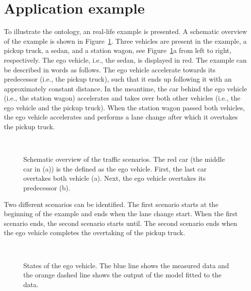 \section{Application example}
\label{sec:example}

To illustrate the ontology, an real-life example is presented. A schematic overview of the example is shown in Figure~\ref{fig:example schematic}. Three vehicles are present in the example, a pickup truck, a sedan, and a station wagon, see Figure~\ref{fig:example schematic}a from left to right, respectively. The ego vehicle, i.e., the sedan, is displayed in red. The example can be described in words as follows. The ego vehicle accelerate towards its predecessor (i.e., the pickup truck), such that it ends up following it with an approximately constant distance. In the meantime, the car behind the ego vehicle (i.e., the station wagon) accelerates and takes over both other vehicles (i.e., the ego vehicle and the pickup truck). When the station wagon passed both vehicles, the ego vehicle accelerates and performs a lane change after which it overtakes the pickup truck.

\begin{figure}
	\centering
	\setlength\figureheight{100pt}
	\setlength\figurewidth{260pt}
	\\
	\caption{Schematic overview of the traffic scenarios. The red car (the middle car in (a)) is the defined as the ego vehicle. First, the last car overtakes both vehicle (a). Next, the ego vehicle overtakes its predecessor (b).}
	\label{fig:example schematic}
\end{figure}

Two different scenarios can be identified. The first scenario starts at the beginning of the example and ends when the lane change start. When the first scenario ends, the second scenario starts until. The second scenario ends when the ego vehicle completes the overtaking of the pickup truck.

\begin{figure}
	\centering
	\setlength\figureheight{150pt}
	\setlength\figurewidth{248pt}
	\\
	\caption{States of the ego vehicle. The blue line shows the measured data and the orange dashed line shows the output of the model fitted to the data.}
\end{figure}

\color{black}
